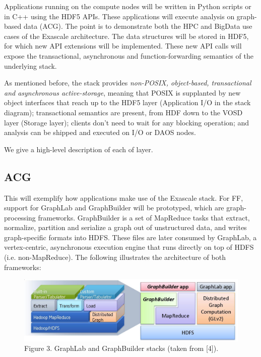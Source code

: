 \documentclass[conference]{IEEEtran}
\begin{document}
Applications running on the compute nodes will be written in Python
scripts or in C++ using the HDF5 APIs. These applications will execute
analysis on graph-based data (ACG). The point is to demonstrate both the
HPC and BigData use cases of the Exascale architecture. The data
structures will be stored in HDF5, for which new API extensions will be
implemented. These new API calls will expose the transactional,
asynchronous and function-forwarding semantics of the underlying stack.

As mentioned before, the stack provides \emph{non-POSIX, object-based,
transactional and asynchronous active-storage}, meaning that POSIX is
supplanted by new object interfaces that reach up to the HDF5 layer
(Application I/O in the stack diagram); transactional semantics are
present, from HDF down to the VOSD layer (Storage layer); clients don't
need to wait for any blocking operation; and analysis can be shipped and
executed on I/O or DAOS nodes.

We give a high-level description of each of layer.

\subsection{ACG}\label{acg}

This will exemplify how applications make use of the Exascale stack. For
FF, support for
GraphLab 
and GraphBuilder will be prototyped, which are graph-processing
frameworks. GraphBuilder is a set of MapReduce tasks that extract,
normalize, partition and serialize a graph out of unstructured data, and
writes graph-specific formats into HDFS. These files are later consumed
by GraphLab, a vertex-centric, asynchronous execution engine that runs
directly on top of HDFS (i.e. non-MapReduce). The following illustrates
the architecture of both frameworks:

\begin{figure}[htbp]
\centering
\includegraphics[scale=0.15]{images/graphlab-and-graphbuilder.png}
\caption{Figure 3. GraphLab and GraphBuilder stacks (taken from
{[}4{]}).}
\end{figure}
\end{document}

